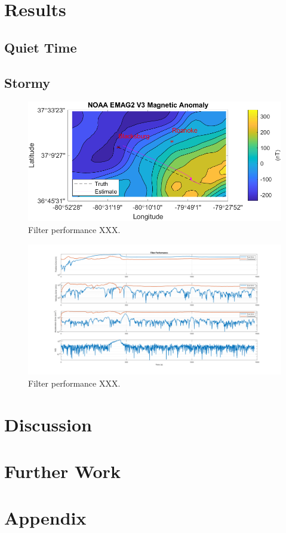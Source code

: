 \documentclass[conf]{new-aiaa}
\begin{document}
\section{Results} %

\subsection{Quiet Time} %

\subsection{Stormy} %

\begin{figure}[h!]
\centering
\includegraphics[width=.75\textwidth]{figures/trajectory.png}
\caption{Filter performance XXX.}
\end{figure}

\begin{figure}[h!]
\centering
\includegraphics[width=1.0\textwidth]{figures/filter_performance.png}
\caption{Filter performance XXX.}
\end{figure}

\section{Discussion} %

\section{Further Work} %

\section*{Appendix} %

\end{document}
